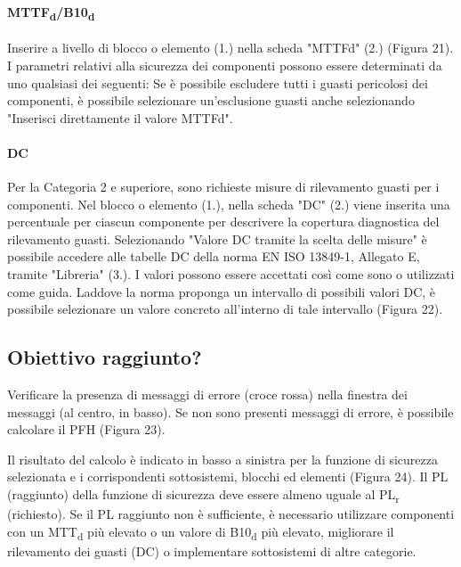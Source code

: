 \documentclass[a4paper,11pt]{article}
\begin{document}
    \paragraph{MTTF\textsubscript{d}/B10\textsubscript{d}}
    Inserire a livello di blocco o elemento (1.) nella scheda "MTTFd" (2.) (Figura 21).
    I parametri relativi alla sicurezza dei componenti possono essere determinati da uno qualsiasi dei seguenti:
    Se è possibile escludere tutti i guasti pericolosi dei componenti, è possibile selezionare un'esclusione guasti anche selezionando "Inserisci direttamente il valore MTTFd".
    \paragraph{\textbf{DC}}
    Per la Categoria 2 e superiore, sono richieste misure di rilevamento guasti per i componenti. Nel blocco o elemento (1.), nella scheda "DC" (2.) viene inserita una percentuale per ciascun componente per descrivere la copertura diagnostica del rilevamento guasti. Selezionando "Valore DC tramite la scelta delle misure" è possibile accedere alle tabelle DC della norma EN ISO 13849-1, Allegato E, tramite "Libreria" (3.). I valori possono essere accettati così come sono o utilizzati come guida. Laddove la norma proponga un intervallo di possibili valori DC, è possibile selezionare un valore concreto all'interno di tale intervallo (Figura 22).

    \subsection{Obiettivo raggiunto?} %
    Verificare la presenza di messaggi di errore (croce rossa) nella finestra dei messaggi (al centro, in basso). Se non sono presenti messaggi di errore, è possibile calcolare il PFH (Figura 23).

    Il risultato del calcolo è indicato in basso a sinistra per la funzione di sicurezza selezionata e i corrispondenti sottosistemi, blocchi ed elementi (Figura 24). Il PL (raggiunto) della funzione di sicurezza deve essere almeno uguale al PL\textsubscript{r} (richiesto). Se il PL raggiunto non è sufficiente, è necessario utilizzare componenti con un MTT\textsubscript{d} più elevato o un valore di B10\textsubscript{d} più elevato, migliorare il rilevamento dei guasti (DC) o implementare sottosistemi di altre categorie.
    \newpage
    
\end{document}
